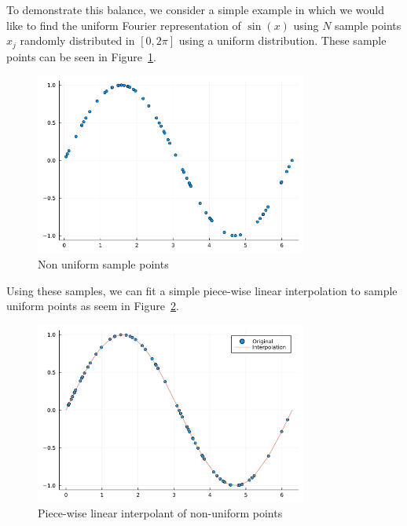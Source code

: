 To demonstrate this balance, we consider a simple example in which we would like to find the uniform Fourier representation of $\sin{(x)} $ using $N$ sample points $x_j$ randomly distributed in $[0, 2\pi]$ using a uniform distribution.
These sample points can be seen in Figure~\ref{fig:nu_points}.
\begin{figure}[htpb]
    \centering
    \includegraphics[width=0.8\textwidth]{images/nu_points.png}
    \caption{Non uniform sample points}
    \label{fig:nu_points}
\end{figure}

Using these samples, we can fit a simple piece-wise linear interpolation to sample uniform points as seem in Figure~\ref{fig:images-interp-png}.
\begin{figure}[htpb]
    \centering
    \includegraphics[width=0.8\textwidth]{images/interp.png}
    \caption{Piece-wise linear interpolant of non-uniform points}
    \label{fig:images-interp-png}
\end{figure}

